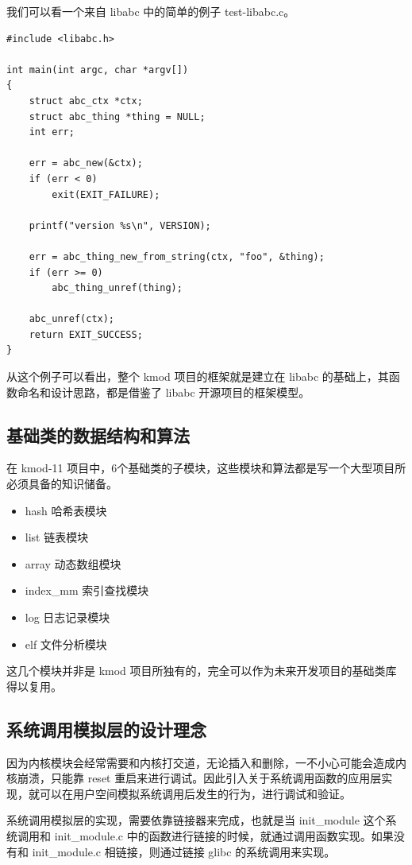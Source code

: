 我们可以看一个来自 libabc 中的简单的例子 test-libabc.c。

{\begin{shaded}\begin{verbatim}
#include <libabc.h>

int main(int argc, char *argv[])
{
    struct abc_ctx *ctx;
    struct abc_thing *thing = NULL;
    int err;

    err = abc_new(&ctx);
    if (err < 0)
        exit(EXIT_FAILURE);

    printf("version %s\n", VERSION);

    err = abc_thing_new_from_string(ctx, "foo", &thing);
    if (err >= 0)
        abc_thing_unref(thing);

    abc_unref(ctx);
    return EXIT_SUCCESS;
}
\end{verbatim}\end{shaded}}
从这个例子可以看出，整个 kmod 项目的框架就是建立在 libabc
的基础上，其函数命名和设计思路，都是借鉴了 libabc 开源项目的框架模型。

\subsection{基础类的数据结构和算法}

在 kmod-11
项目中，6个基础类的子模块，这些模块和算法都是写一个大型项目所必须具备的知识储备。

\begin{itemize}
\item
  hash 哈希表模块
\item
  list 链表模块
\item
  array 动态数组模块
\item
  index\_mm 索引查找模块
\item
  log 日志记录模块
\item
  elf 文件分析模块
\end{itemize}
这几个模块并非是 kmod
项目所独有的，完全可以作为未来开发项目的基础类库得以复用。

\subsection{系统调用模拟层的设计理念}

因为内核模块会经常需要和内核打交道，无论插入和删除，一不小心可能会造成内核崩溃，只能靠
reset
重启来进行调试。因此引入关于系统调用函数的应用层实现，就可以在用户空间模拟系统调用后发生的行为，进行调试和验证。

系统调用模拟层的实现，需要依靠链接器来完成，也就是当 init\_module
这个系统调用和 init\_module.c
中的函数进行链接的时候，就通过调用函数实现。如果没有和 init\_module.c
相链接，则通过链接 glibc 的系统调用来实现。


